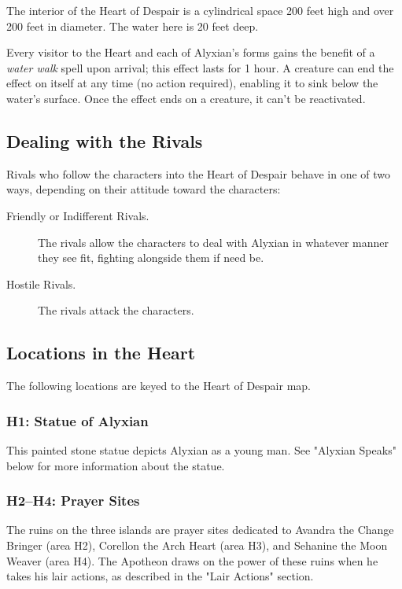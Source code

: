 \documentclass[a4paper, 11pt, bg=full, twocolumn, nooutline]{dndbook}
\begin{document}
The interior of the Heart of Despair is a cylindrical space 200 feet high and over 200 feet in diameter. The water here is 20 feet deep.

Every visitor to the Heart and each of Alyxian's forms gains the benefit of a \textit{water walk} spell upon arrival; this effect lasts for 1 hour. A creature can end the effect on itself at any time (no action required), enabling it to sink below the water's surface. Once the effect ends on a creature, it can't be reactivated.

\subsection{Dealing with the Rivals}

Rivals who follow the characters into the Heart of Despair behave in one of two ways, depending on their attitude toward the characters:

\begin{description}
\item[Friendly or Indifferent Rivals.] The rivals allow the characters to deal with Alyxian in whatever manner they see fit, fighting alongside them if need be.
\item[Hostile Rivals.] The rivals attack the characters.
\end{description}

\subsection{Locations in the Heart}

The following locations are keyed to the Heart of Despair map.



\subsubsection{H1: Statue of Alyxian}

This painted stone statue depicts Alyxian as a young man. See "Alyxian Speaks" below for more information about the statue.

\subsubsection{H2--H4: Prayer Sites}

The ruins on the three islands are prayer sites dedicated to Avandra the Change Bringer (area H2), Corellon the Arch Heart (area H3), and Sehanine the Moon Weaver (area H4). The Apotheon draws on the power of these ruins when he takes his lair actions, as described in the "Lair Actions" section.
\end{document}
